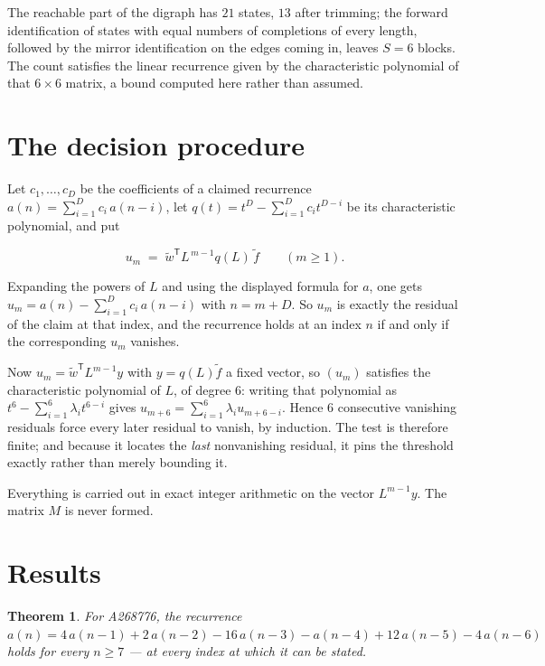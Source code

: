 \documentclass[11pt]{article}
\newtheorem{theorem}{Theorem}
\theoremstyle{definition}
\begin{document}
The reachable part of the digraph has $21$ states, $13$ after trimming; the forward identification of states with equal numbers of completions of every length, followed by the mirror identification on the edges coming in, leaves $S = 6$ blocks. The count satisfies the linear recurrence given by the characteristic polynomial of that $6\times6$ matrix, a bound computed here rather than assumed.

\section{The decision procedure}

Let $c_1,\dots,c_D$ be the coefficients of a claimed recurrence $a(n) = \sum_{i=1}^{D} c_i\,a(n-i)$, let $q(t) = t^{D} - \sum_{i=1}^{D} c_i t^{D-i}$ be its characteristic polynomial, and put

\[u_m \;=\; \tilde w^{\mathsf T} L^{\,m-1} q(L)\,\tilde f \qquad (m \ge 1).\]

Expanding the powers of $L$ and using the displayed formula for $a$, one gets $u_m = a(n) - \sum_{i=1}^{D} c_i\,a(n-i)$ with $n = m + D$. So $u_m$ is exactly the residual of the claim at that index, and the recurrence holds at an index $n$ if and only if the corresponding $u_m$ vanishes.

Now $u_m = \tilde w^{\mathsf T} L^{m-1} y$ with $y = q(L)\tilde f$ a fixed vector, so $(u_m)$ satisfies the characteristic polynomial of $L$, of degree $6$: writing that polynomial as $t^{6} - \sum_{i=1}^{6} \lambda_i t^{6-i}$ gives $u_{m+6} = \sum_{i=1}^{6} \lambda_i u_{m+6-i}$. Hence $6$ consecutive vanishing residuals force every later residual to vanish, by induction. The test is therefore finite; and because it locates the {\itshape last} nonvanishing residual, it pins the threshold exactly rather than merely bounding it.

Everything is carried out in exact integer arithmetic on the vector $L^{m-1}y$. The matrix $M$ is never formed.

\section{Results}

\begin{theorem} For A268776, the recurrence $a(n) = 4\,a(n-1) + 2\,a(n-2) - 16\,a(n-3) - a(n-4) + 12\,a(n-5) - 4\,a(n-6)$ holds for every $n \ge 7$ --- at every index at which it can be stated.\end{theorem}
\end{document}
